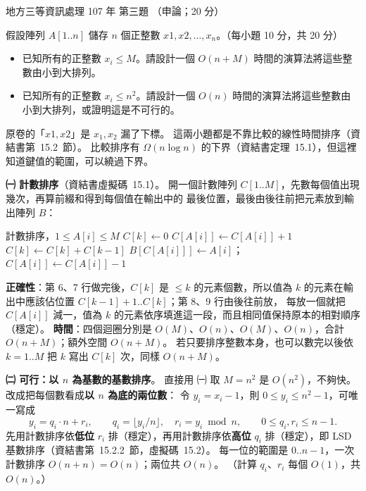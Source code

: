 \begin{pastexam}[label={px:df3-107-ds-03}]{地方三等資訊處理 107 年 第三題}
（申論；20 分）

假設陣列 $A[1..n]$ 儲存 $n$ 個正整數 $x1, x2,\ldots, x_n$。（每小題 10 分，共 20 分）
\begin{itemize}[leftmargin=2.2em]
\item[㈠] 已知所有的正整數 $x_i \le M$。請設計一個 $O(n+M)$ 時間的演算法將這些整數由小到大排列。
\item[㈡] 已知所有的正整數 $x_i \le n^2$。請設計一個 $O(n)$ 時間的演算法將這些整數由小到大排列，或證明這是不可行的。
\end{itemize}
\end{pastexam}

\begin{pastsoln}
原卷的「$x1, x2$」是 $x_1, x_2$ 漏了下標。 這兩小題都是不靠比較的線性時間排序（資結書第~15.2~節）。 比較排序有
$\Omega(n \log n)$ 的下界（資結書定理~15.1），但這裡知道鍵值的範圍，可以繞過下界。

\textbf{㈠ 計數排序}（資結書虛擬碼~15.1）。 開一個計數陣列 $C[1..M]$，先數每個值出現幾次，再算前綴和得到每個值在輸出中的
最後位置，最後由後往前把元素放到輸出陣列 $B$：
\begin{pseudo}[unbreakable]{計數排序，$1 \le A[i] \le M$}
        \State $C[k] \gets 0$
    \EndFor
        \State $C[A[i]] \gets C[A[i]] + 1$ 
    \EndFor
        \State $C[k] \gets C[k] + C[k - 1]$ 
    \EndFor
        \State $B[C[A[i]]] \gets A[i]$；$C[A[i]] \gets C[A[i]] - 1$
    \EndFor
\EndProcedure
\end{pseudo}
\textbf{正確性}：第 6、7 行做完後，$C[k]$ 是 $\le k$ 的元素個數，所以值為 $k$ 的元素在輸出中應該佔位置 $C[k-1]+1..C[k]$；第 8、9 行由後往前放，
每放一個就把 $C[A[i]]$ 減一，值為 $k$ 的元素依序填進這一段，而且相同值保持原本的相對順序（穩定）。 \textbf{時間}：四個迴圈分別是
$O(M)$、$O(n)$、$O(M)$、$O(n)$，合計 $O(n + M)$；額外空間 $O(n + M)$。 若只要排序整數本身，也可以數完以後依 $k = 1..M$ 把 $k$ 寫出
$C[k]$ 次，同樣 $O(n + M)$。

\textbf{㈡ 可行：以 $n$ 為基數的基數排序}。 直接用 ㈠ 取 $M = n^2$ 是 $O(n^2)$，不夠快。 改成把每個數看成\textbf{以 $n$ 為底的兩位數}：
令 $y_i = x_i - 1$，則 $0 \le y_i \le n^2 - 1$，可唯一寫成
\[
y_i = q_i \cdot n + r_i,\qquad q_i = \lfloor y_i / n \rfloor,\quad r_i = y_i \bmod n,\qquad 0 \le q_i, r_i \le n - 1.
\]
先用計數排序依\textbf{低位} $r_i$ 排（穩定），再用計數排序依\textbf{高位} $q_i$ 排（穩定），即 LSD 基數排序（資結書第~15.2.2~節，虛擬碼~15.2）。
每一位的範圍是 $0..n-1$，一次計數排序 $O(n + n) = O(n)$；兩位共 $O(n)$。 （計算 $q_i$、$r_i$ 每個 $O(1)$，共 $O(n)$。）


\end{pastsoln}

